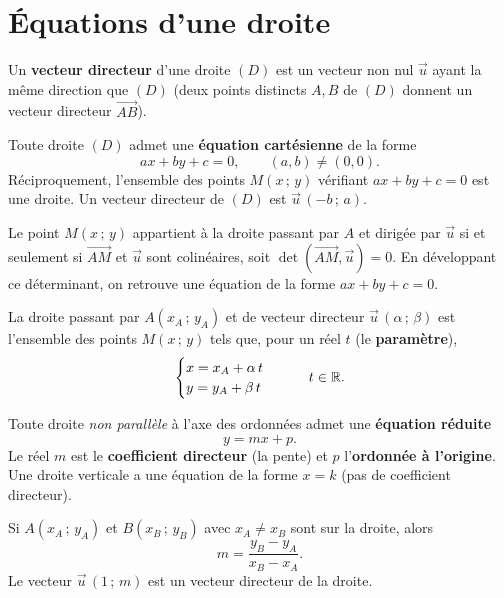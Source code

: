 \section{Équations d'une droite}

\begin{definition}
Un \textbf{vecteur directeur} d'une droite $(D)$ est un vecteur non nul $\vec{u}$
ayant la même direction que $(D)$ (deux points distincts $A,B$ de $(D)$ donnent un
vecteur directeur $\overrightarrow{AB}$).
\end{definition}

\begin{theoreme}
Toute droite $(D)$ admet une \textbf{équation cartésienne} de la forme
\[ ax+by+c=0,\qquad (a,b)\neq(0,0). \]
Réciproquement, l'ensemble des points $M(x\,;\,y)$ vérifiant $ax+by+c=0$ est une
droite. Un vecteur directeur de $(D)$ est $\vec{u}\,(-b\,;\,a)$.
\end{theoreme}

\begin{remarque}
Le point $M(x\,;\,y)$ appartient à la droite passant par $A$ et dirigée par
$\vec{u}$ si et seulement si $\overrightarrow{AM}$ et $\vec{u}$ sont colinéaires,
soit $\det(\overrightarrow{AM},\vec{u})=0$. En développant ce déterminant, on
retrouve une équation de la forme $ax+by+c=0$.
\end{remarque}

\begin{definition}
La droite passant par $A(x_A\,;\,y_A)$ et de vecteur directeur $\vec{u}\,(\alpha\,;\,\beta)$
est l'ensemble des points $M(x\,;\,y)$ tels que, pour un réel $t$ (le \textbf{paramètre}),
\[ \begin{cases} x=x_A+\alpha\,t \\ y=y_A+\beta\,t \end{cases}\qquad t\in\mathbb{R}. \]
\end{definition}

\begin{definition}
Toute droite \emph{non parallèle} à l'axe des ordonnées admet une
\textbf{équation réduite}
\[ y=mx+p. \]
Le réel $m$ est le \textbf{coefficient directeur} (la pente) et $p$ l'\textbf{ordonnée
à l'origine}. Une droite verticale a une équation de la forme $x=k$ (pas de
coefficient directeur).
\end{definition}

\begin{propriete}
Si $A(x_A\,;\,y_A)$ et $B(x_B\,;\,y_B)$ avec $x_A\neq x_B$ sont sur la droite, alors
\[ m=\frac{y_B-y_A}{x_B-x_A}. \]
Le vecteur $\vec{u}\,(1\,;\,m)$ est un vecteur directeur de la droite.
\end{propriete}


